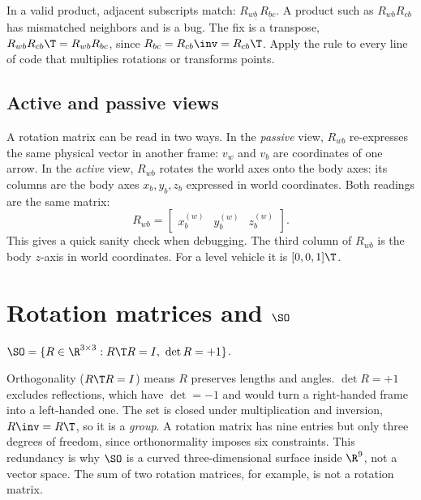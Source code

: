\begin{keyidea}
In a valid product, adjacent subscripts match: $R_{w\underline{b}}\,R_{\underline{b}c}$. A product such as
$R_{wb}R_{cb}$ has mismatched neighbors and is a bug. The fix is a transpose,
$R_{wb}R_{cb}\T = R_{wb}R_{bc}$, since $R_{bc} = R_{cb}\inv = R_{cb}\T$. Apply the rule to every line of
code that multiplies rotations or transforms points.
\end{keyidea}

\subsection{Active and passive views}

A rotation matrix can be read in two ways. In the \emph{passive} view, $R_{wb}$ re-expresses the
same physical vector in another frame: $v_w$ and $v_b$ are coordinates of one arrow. In the
\emph{active} view, $R_{wb}$ rotates the world axes onto the body axes: its columns are the body
axes $x_b, y_b, z_b$ expressed in world coordinates. Both readings are the same matrix:
\begin{equation}
  R_{wb} = \begin{bmatrix} x_b^{(w)} & y_b^{(w)} & z_b^{(w)} \end{bmatrix}.
\end{equation}
This gives a quick sanity check when debugging. The third column of $R_{wb}$ is the body $z$-axis
in world coordinates. For a level vehicle it is $[0,0,1]\T$.

\section{Rotation matrices and \texorpdfstring{$\SO$}{SO(3)}}

\begin{definition}
$\SO = \{ R \in \R^{3\times3} : R\T R = I,\ \det R = +1 \}$.
\end{definition}

Orthogonality ($R\T R = I$) means $R$ preserves lengths and angles. $\det R = +1$ excludes
reflections, which have $\det = -1$ and would turn a right-handed frame into a left-handed one. The
set is closed under multiplication and inversion, $R\inv = R\T$, so it is a \emph{group}. A rotation
matrix has nine entries but only three degrees of freedom, since orthonormality imposes six
constraints. This redundancy is why $\SO$ is a curved three-dimensional surface inside $\R^9$, not a
vector space. The sum of two rotation matrices, for example, is not a rotation matrix.

